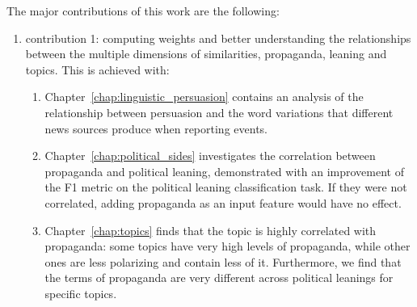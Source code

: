 The major contributions of this work are the following:
\begin{enumerate}
    \item contribution 1: computing weights and better understanding the relationships between the multiple dimensions of similarities, propaganda, leaning and topics. This is achieved with:
    \begin{enumerate}
        \item Chapter~\ref{chap:linguistic_persuasion} contains an analysis of the relationship between persuasion and the word variations that different news sources produce when reporting events.
        \item Chapter~\ref{chap:political_sides} investigates the correlation between propaganda and political leaning, demonstrated with an improvement of the F1 metric on the political leaning classification task. If they were not correlated, adding propaganda as an input feature would have no effect.
        \item Chapter~\ref{chap:topics} finds that the topic is highly correlated with propaganda: some topics have very high levels of propaganda, while other ones are less polarizing and contain less of it. Furthermore, we find that the terms of propaganda are very different across political leanings for specific topics. %
        

\end{enumerate}
\end{enumerate}
